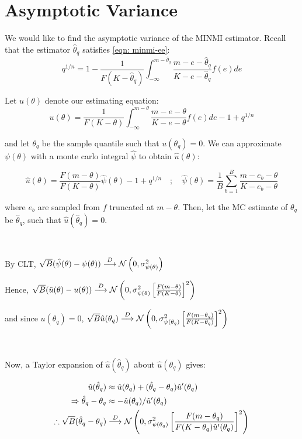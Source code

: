 \section{Asymptotic Variance}

We would like to find the asymptotic variance of the MINMI estimator. Recall that the estimator $\hat\theta_q$ satisfies \autoref{eqn: minmi-ee}: \[
q^{1/n} = 1 - \frac{1}{F(K - \hat\theta_q)} \int^{m-\hat\theta_q}_{-\infty} \frac{m-e-\hat\theta_q}{K-e-\hat\theta_q} f(e) de
\]

Let $u(\theta)$ denote our estimating equation: \[
    u(\theta) = \frac{1}{F(K - \theta)} \int^{m-\theta}_{-\infty} \frac{m-e-\theta}{K-e-\theta} f(e) de - 1 + q^{1/n}
\]

and let $\theta_q$ be the sample quantile such that $u(\theta_q) = 0$. We can approximate $\psi(\theta)$ with a monte carlo integral $\hat\psi$ to obtain $\hat{u}(\theta)$:

\begin{equation}
    \hat{u}(\theta) = \frac{F(m - \theta)}{F(K - \theta)} \hat\psi(\theta) - 1 + q^{1/n} \quad;\quad \hat\psi(\theta) = \frac{1}{B} \sum_{b=1}^B \frac{m-e_b-\theta}{K-e_b-\theta}
\end{equation}

where $e_b$ are sampled from $f$ truncated at $m-\theta$. Then, let the MC estimate of $\theta_q$ be $\hat\theta_q$, such that $\hat{u}(\hat\theta_q) = 0$. 

\

By CLT, $\sqrt{B} (\hat\psi(\theta) - \psi(\theta) ) \overset{D}{\longrightarrow} \mathcal{N} \left( 0, \sigma^2_{\psi(\theta)} \right)$

Hence, $\sqrt{B} (\hat{u}(\theta) - u(\theta) ) \overset{D}{\longrightarrow} \mathcal{N} \left( 0, \sigma^2_{\psi(\theta)} \left[ \frac{F(m - \theta)}{F(K - \theta)} \right]^2 \right)$

and since $u(\theta_q) = 0$, $\sqrt{B} \hat{u}(\theta_q) \overset{D}{\longrightarrow} \mathcal{N} \left( 0, \sigma^2_{\psi(\theta_q)} \left[ \frac{F(m - \theta_q)}{F(K - \theta_q)} \right]^2 \right)$

\

Now, a Taylor expansion of $\hat{u}(\hat\theta_q)$ about $\hat{u}(\theta_q)$ gives:

\begin{align}
    \hat{u}(\hat\theta_q) &\approx \hat{u}(\theta_q) + (\hat\theta_q - \theta_q)\hat{u}^\prime (\theta_q) \\
    \Rightarrow \hat\theta_q - \theta_q &\approx - \hat{u}(\theta_q)/\hat{u}^\prime (\theta_q) \\
    \therefore \sqrt{B} (\hat\theta_q - \theta_q) &\overset{D}{\longrightarrow}  \mathcal{N} \left( 0, \sigma^2_{\psi(\theta_q)} \left[ \frac{F(m - \theta_q)}{F(K - \theta_q)\hat{u}^\prime (\theta_q)} \right]^2 \right)
\end{align}

